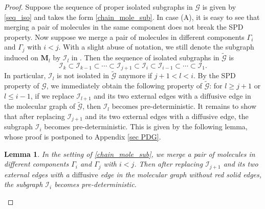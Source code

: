 \documentclass{article}
\newcommand{\1}{\mathds{1}}
\numberwithin{equation}{section}
\newcommand{\be}{\begin{equation}}
\newcommand{\ee}{\end{equation}}
\renewcommand{\cal}{\mathcal}
\newcommand{\wt}{\widetilde}
\renewcommand{\leq}{\leqslant}
\renewcommand{\geq}{\geqslant}
\renewcommand{\le}{\leq}
\renewcommand{\ge}{\geq}
\newcommand{\dashed}{\text{diffusive}}
\theoremstyle{plain} %
\newtheorem{lemma}[theorem]{Lemma}
\theoremstyle{remark}
\newcommand{\Pol}{{\mathbf{M}}}
\newcommand{\Iso}{{\mathcal I}}
\begin{document}
\begin{proof}
Suppose the sequence of proper isolated subgraphs in $\cal G$ is given by \eqref{seq_iso} and takes the form \eqref{chain_mole_sub}. In case (A), it is easy to see that merging a pair of molecules in the same component does not break the SPD property. Now suppose we merge a pair of molecules in different components $\Gamma_{i}$ and $\Gamma_j$ with $i<j$. 
With a slight abuse of notation, we still denote the subgraph induced on $\Pol_l$ by $\Iso_l$ in \smash{$\wt {\cal G}$}. Then the sequence of isolated subgraphs in $\wt{\cal G}$ is
$$ \Iso_k \subset \Iso_{k-1} \subset \cdots \subset \Iso_{j+1} \subset \Iso_i \subset \Iso_{i-1} \subset \cdots \subset \Iso_1. $$
In particular, $\Iso_l$ is not isolated in $\wt{\cal G}$ anymore if $j+1<l <i$. 
By the SPD property of $\cal G$, we immediately obtain the following property of $\wt{\cal G}$: for $l\ge j+1$ or $l\le i-1$, if we replace $\Iso_{l+1}$ and its two external edges with a $\dashed$ edge in the molecular graph of $\wt{\cal G}$, then $\Iso_l$ becomes pre-deterministic. 
It remains to show that after replacing $\Iso_{j+1}$ and its two external edges with a $\dashed$ edge, the subgraph $\Iso_i$ becomes pre-deterministic. This is given by the following lemma, whose proof is postponed to Appendix \ref{sec PDG}.

\begin{lemma}\label{hard lemmdot}
In the setting of \eqref{chain_mole_sub}, we merge a pair of molecules in different components $\Gamma_{i}$ and $\Gamma_j$ with $i<j$. Then after replacing $\Iso_{j+1}$ and its two external edges with a $\dashed$ edge in the molecular graph without red solid edges, the subgraph $\Iso_i$ becomes pre-deterministic. 
\end{lemma}


\end{proof}
\end{document}
